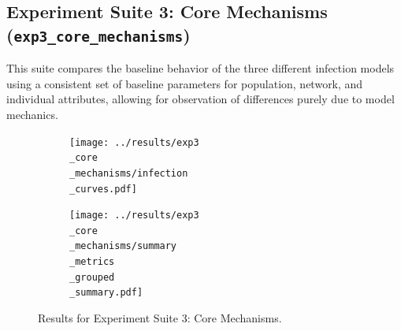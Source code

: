 \documentclass[12pt]{article}
\begin{document}
\subsection[Exp Suite 3: Core Mechanisms]{Experiment Suite 3: Core Mechanisms (\texttt{exp3\_core\_mech\-a\-nisms})}
This suite compares the baseline behavior of the three different infection models using a consistent set of baseline parameters for population, network, and individual attributes, allowing for observation of differences purely due to model mechanics. \begin{figure}[htbp!] \centering \begin{subfigure}{.48\textwidth} \centering \texttt{[image: ../results/exp3\\\_core\\\_mechanisms/infection\\\_curves.pdf]} 
 \label{fig:exp3_curves} \end{subfigure} \hfill \begin{subfigure}{.48\textwidth} \centering \texttt{[image: ../results/exp3\\\_core\\\_mechanisms/summary\\\_metrics\\\_grouped\\\_summary.pdf]} 
 \label{fig:exp3_summary} \end{subfigure} \caption[Exp Suite 3 Results]{Results for Experiment Suite 3: Core Mechanisms.} \label{fig:exp3_results} \end{figure}
\begin{table}[H]
\centering
\caption{Summary Metrics for Experiment Suite 3: Core Mechanisms}
\label{tab:exp3_metrics}
\end{table}
\end{document}
